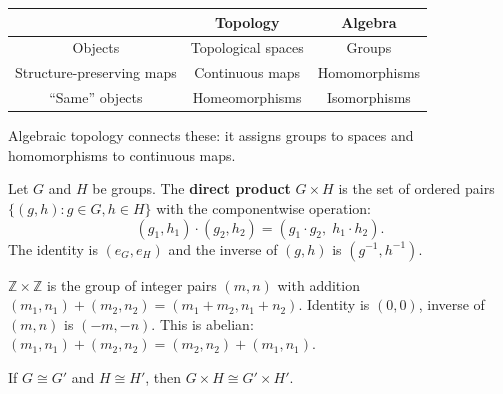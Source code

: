 \documentclass[11pt]{report}
\begin{document}
\begin{rembox}
\begin{center}
\begin{tabular}{|c|c|c|}
\hline
& \textbf{Topology} & \textbf{Algebra} \\
\hline
Objects & Topological spaces & Groups \\
\hline
Structure-preserving maps & Continuous maps & Homomorphisms \\
\hline
``Same'' objects & Homeomorphisms & Isomorphisms \\
\hline
\end{tabular}
\end{center}
Algebraic topology connects these: it assigns groups to spaces and homomorphisms to continuous maps.
\end{rembox}

\begin{defbox}
Let $G$ and $H$ be groups. The \textbf{direct product} $G \times H$ is the set of ordered pairs $\{(g, h) : g \in G, h \in H\}$ with the componentwise operation:
\[(g_1, h_1) \cdot (g_2, h_2) = (g_1 \cdot g_2, \; h_1 \cdot h_2).\]
The identity is $(e_G, e_H)$ and the inverse of $(g, h)$ is $(g^{-1}, h^{-1})$.
\end{defbox}

\begin{exbox}
$\mathbb{Z} \times \mathbb{Z}$ is the group of integer pairs $(m, n)$ with addition $(m_1, n_1) + (m_2, n_2) = (m_1 + m_2, n_1 + n_2)$. Identity is $(0, 0)$, inverse of $(m, n)$ is $(-m, -n)$. This is abelian: $(m_1, n_1) + (m_2, n_2) = (m_2, n_2) + (m_1, n_1)$.
\end{exbox}

\begin{thmbox}
If $G \cong G'$ and $H \cong H'$, then $G \times H \cong G' \times H'$.
\end{thmbox}
\end{document}
